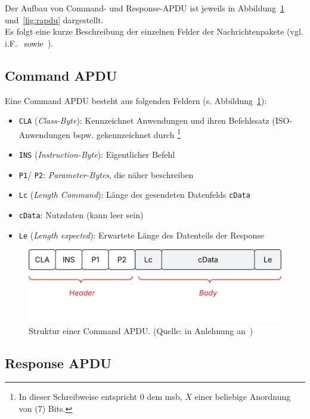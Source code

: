 \noindent
Der Aufbau von Command- und Response-APDU ist jeweils in Abbildung~\ref{fig:capdu} und~\ref{fig:rapdu} dargestellt.\\
Es folgt eine kurze Beschreibung der einzelnen Felder der Nachrichtenpakete (vgl. i.F.~\cite[23 ff.]{ITS5} sowie~\cite[430 ff.]{RE02}).

\subsection*{Command APDU}

Eine Command APDU besteht aus folgenden Feldern (s. Abbildung~\ref{fig:capdu}):

\begin{itemize}
    \itemsep0.5em
    \item \texttt{CLA} (\textit{Class-Byte}): Kennzeichnet Anwendungen und ihren Befehlssatz (ISO-Anwendungen bspw. gekennzeichnet durch \footnote{
    In dieser Schreibweise entspricht $0$ dem msb, $X$ einer beliebige Anordnung von (7) Bits.
    }
    \item \texttt{INS} (\textit{Instruction-Byte}): Eigentlicher Befehl
    \item \texttt{P1}/ \texttt{P2}: \textit{Parameter-Bytes}, die  näher beschreiben
    \item \texttt{Lc} (\textit{Length Command}): Länge des gesendeten Datenfelds \texttt{cData}
    \item \texttt{cData}: Nutzdaten (kann leer sein)
    \item \texttt{Le} (\textit{Length expected}): Erwartete Länge des Datenteils der Response
 \end{itemize}

\begin{figure}
    \centering
    \includegraphics[scale=0.4]{aufgabe 1/img/capdu.svg}
    \caption{Struktur einer Command APDU. (Quelle: in Anlehnung an~\cite[\textbf{Abb 2.5}, 23]{ITS5})}
    \label{fig:capdu}
\end{figure}


\subsection*{Response APDU}

